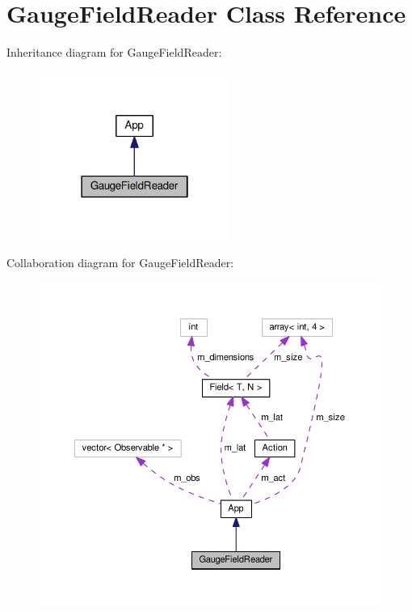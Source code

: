 \hypertarget{classGaugeFieldReader}{}\section{Gauge\+Field\+Reader Class Reference}
\label{classGaugeFieldReader}


Inheritance diagram for Gauge\+Field\+Reader\+:\nopagebreak
\begin{figure}[H]
\begin{center}
\leavevmode
\includegraphics[width=178pt]{classGaugeFieldReader__inherit__graph}
\end{center}
\end{figure}


Collaboration diagram for Gauge\+Field\+Reader\+:\nopagebreak
\begin{figure}[H]
\begin{center}
\leavevmode
\includegraphics[width=350pt]{classGaugeFieldReader__coll__graph}
\end{center}
\end{figure}

